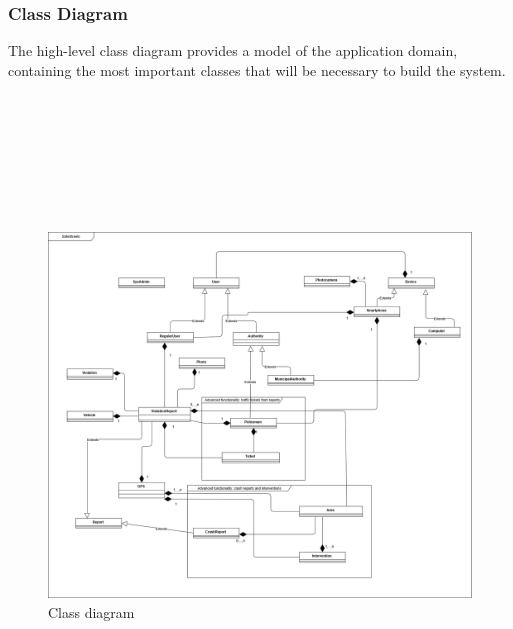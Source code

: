 \subsubsection{Class Diagram}
The high-level class diagram provides a model of the application domain, containing the most important classes that will be necessary to build the system. \\ \\ \\ \\ \\ \\ \\ \\
\begin{figure}[H]
	\centering
	\includegraphics[width=\textwidth]{Images/ClassDiagram.png}
	\caption{\label{fig:metamodel2}Class diagram}
\end{figure}

\newpage

